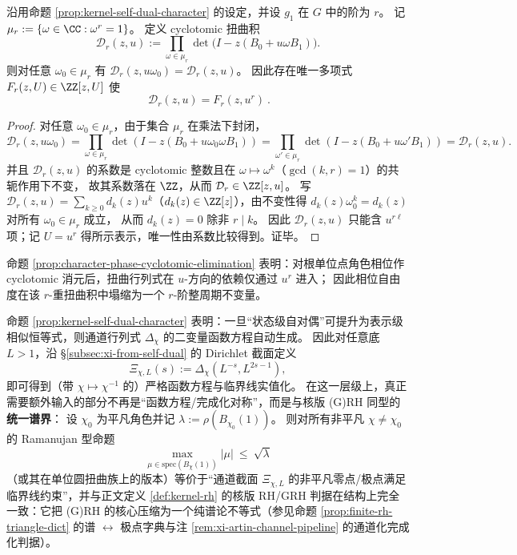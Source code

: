 \begin{proposition}\label{prop:character-phase-cyclotomic-elimination}
沿用命题 \ref{prop:kernel-self-dual-character} 的设定，并设 \(g_1\) 在 \(G\) 中的阶为 \(r\)。
记
\(
\mu_r:=\{\omega\in\CC:\omega^r=1\}
\)。
定义 cyclotomic 扭曲积
\[
\mathcal{D}_r(z,u):=\prod_{\omega\in\mu_r}\det\!\bigl(I-z(B_0+u\omega B_1)\bigr).
\]
则对任意 \(\omega_0\in\mu_r\) 有 \(\mathcal{D}_r(z,u\omega_0)=\mathcal{D}_r(z,u)\)。
因此存在唯一多项式 \(F_r(z,U)\in\ZZ[z,U]\) 使
\[
\boxed{\ \mathcal{D}_r(z,u)=F_r(z,u^r)\ }.
\]
\end{proposition}
\begin{proof}
对任意 \(\omega_0\in\mu_r\)，由于集合 \(\mu_r\) 在乘法下封闭，
\[
\mathcal{D}_r(z,u\omega_0)
=\prod_{\omega\in\mu_r}\det(I-z(B_0+u\omega_0\omega B_1))
=\prod_{\omega'\in\mu_r}\det(I-z(B_0+u\omega' B_1))
=\mathcal{D}_r(z,u).
\]
并且 \(\mathcal{D}_r(z,u)\) 的系数是 cyclotomic 整数且在 \(\omega\mapsto\omega^k\)（\(\gcd(k,r)=1\)）的共轭作用下不变，
故其系数落在 \(\ZZ\)，从而 \(\mathcal{D}_r\in\ZZ[z,u]\)。
写 \(\mathcal{D}_r(z,u)=\sum_{k\ge 0}d_k(z)u^k\)（\(d_k(z)\in\ZZ[z]\)），由不变性得
\(d_k(z)\omega_0^k=d_k(z)\) 对所有 \(\omega_0\in\mu_r\) 成立，
从而 \(d_k(z)=0\) 除非 \(r\mid k\)。
因此 \(\mathcal{D}_r(z,u)\) 只能含 \(u^{r\ell}\) 项；记 \(U=u^r\) 得所示表示，唯一性由系数比较得到。证毕。
\end{proof}

\begin{remark}\label{rem:character-phase-cyclotomic-elimination-compress}
命题 \ref{prop:character-phase-cyclotomic-elimination} 表明：对根单位点角色相位作 cyclotomic 消元后，扭曲行列式在 \(u\)-方向的依赖仅通过 \(u^r\) 进入；
因此相位自由度在该 \(r\)-重扭曲积中塌缩为一个 \(r\)-阶整周期不变量。
\end{remark}

\begin{remark}\label{rem:kernel-self-dual-character-ramanujan}
命题 \ref{prop:kernel-self-dual-character} 表明：一旦“状态级自对偶”可提升为表示级相似恒等式，则通道行列式 \(\Delta_\chi\) 的二变量函数方程自动生成。
因此对任意底 \(L>1\)，沿 \S\ref{subsec:xi-from-self-dual} 的 Dirichlet 截面定义
\[
\Xi_{\chi,L}(s):=\Delta_\chi(L^{-s},L^{2s-1}),
\]
即可得到（带 \(\chi\mapsto\chi^{-1}\) 的）严格函数方程与临界线实值化。
在这一层级上，真正需要额外输入的部分不再是“函数方程/完成化对称”，而是与核版 (G)RH 同型的\textbf{统一谱界}：
设 \(\chi_0\) 为平凡角色并记 \(\lambda:=\rho(B_{\chi_0}(1))\)。
则对所有非平凡 \(\chi\neq\chi_0\) 的 Ramanujan 型命题
\[
\max_{\mu\in\mathrm{spec}(B_\chi(1))}|\mu|\ \le\ \sqrt{\lambda}
\]
（或其在单位圆扭曲族上的版本）等价于“通道截面 \(\Xi_{\chi,L}\) 的非平凡零点/极点满足临界线约束”，并与正文定义 \ref{def:kernel-rh} 的核版 RH/GRH 判据在结构上完全一致：它把 (G)RH 的核心压缩为一个纯谱论不等式（参见命题 \ref{prop:finite-rh-triangle-dict} 的谱 \(\leftrightarrow\) 极点字典与注 \ref{rem:xi-artin-channel-pipeline} 的通道化完成化判据）。
\end{remark}

